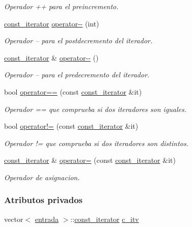 \begin{DoxyCompactItemize}
\begin{DoxyCompactList}\small\item\em Operador ++ para el preincremento. \end{DoxyCompactList}\item 
\hyperlink{classconjunto_1_1const__iterator}{const\-\_\-iterator} \hyperlink{classconjunto_1_1const__iterator_a486a5816bed5c49230d873728524500b}{operator-\/-\/} (int)
\begin{DoxyCompactList}\small\item\em Operador -- para el postdecremento del iterador. \end{DoxyCompactList}\item 
\hyperlink{classconjunto_1_1const__iterator}{const\-\_\-iterator} \& \hyperlink{classconjunto_1_1const__iterator_a304c7e72e7e7a2cd70bd02d7659e0fbc}{operator-\/-\/} ()
\begin{DoxyCompactList}\small\item\em Operador -- para el predecremento del iterador. \end{DoxyCompactList}\item 
bool \hyperlink{classconjunto_1_1const__iterator_a6d2a0501cd5eeea3db0bf9a6a553aa5f}{operator==} (const \hyperlink{classconjunto_1_1const__iterator}{const\-\_\-iterator} \&it)
\begin{DoxyCompactList}\small\item\em Operador == que comprueba si dos iteradores son iguales. \end{DoxyCompactList}\item 
bool \hyperlink{classconjunto_1_1const__iterator_aea197d9ca07e8451eb857ae84d3796ff}{operator!=} (const \hyperlink{classconjunto_1_1const__iterator}{const\-\_\-iterator} \&it)
\begin{DoxyCompactList}\small\item\em Operador != que comprueba si dos iteradores son distintos. \end{DoxyCompactList}\item 
\hyperlink{classconjunto_1_1const__iterator}{const\-\_\-iterator} \& \hyperlink{classconjunto_1_1const__iterator_af264da07d68fd7bf592a9bff0223ef3b}{operator=} (const \hyperlink{classconjunto_1_1const__iterator}{const\-\_\-iterator} \&it)
\begin{DoxyCompactList}\small\item\em Operador de asignacion. \end{DoxyCompactList}\end{DoxyCompactItemize}
\subsubsection*{Atributos privados}
\begin{DoxyCompactItemize}
\item 
vector$<$ \hyperlink{classconjunto_a09cad766dd65de73e51eae21f9d22585}{entrada} $>$\-::\hyperlink{classconjunto_1_1const__iterator}{const\-\_\-iterator} \hyperlink{classconjunto_1_1const__iterator_a6ffe0c493b12aa9f40dc1501f0c904fc}{c\-\_\-itv}
\end{DoxyCompactItemize}
